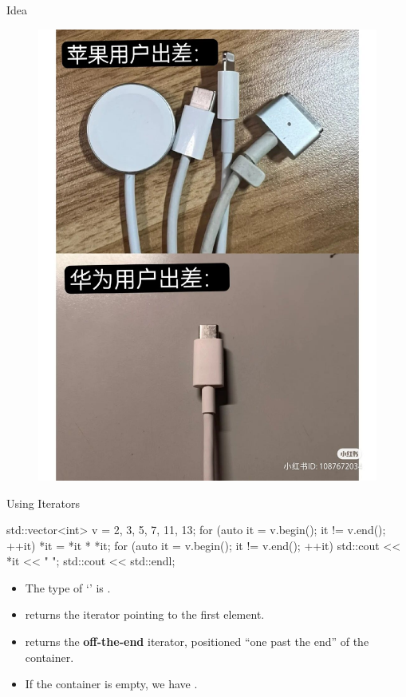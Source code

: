 \begin{frame}{Idea}
\begin{figure}[h]
\begin{minipage}{0.48\textwidth}
            \includegraphics[scale=0.135]{figures/interface2.jpg}
        \end{minipage}
    \end{figure}
\end{frame}

\begin{frame}[fragile]{Using Iterators}
    \begin{cpp}
std::vector<int> v = {2, 3, 5, 7, 11, 13};
for (auto it = v.begin(); it != v.end(); ++it)
  *it = *it * *it;
for (auto it = v.begin(); it != v.end(); ++it)
  std::cout << *it << " ";
std::cout << std::endl;
    \end{cpp}
    \begin{itemize}
        \item The type of `' is .
        \item {} returns the iterator pointing to the first element.
        \item {} returns the \textbf{off-the-end} iterator, positioned ``one past the end'' of the container.
        \item If the container is empty, we have .
    \end{itemize}
\end{frame}

